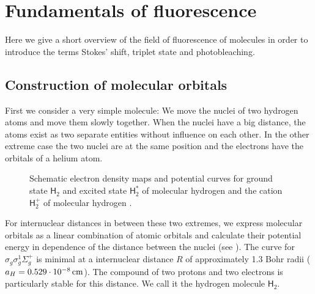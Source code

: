 \newenvironment{fenster}{%
  \begin{addmargin*}[
  5em]{5em}%
    \begin{minipage}{\linewidth}%
    \vspace{1em}
      \rule{\linewidth}{2pt}%
}{%
    \rule[
.25\baselineskip]{\linewidth}{2pt}%
\vspace{1em}
    \end{minipage}%
  \end{addmargin*}%
}
\renewcommand{\H}{\textsf{H}}
\renewcommand{\O}{\textsf{O}}
\section{Fundamentals of fluorescence}
\begin{summary}
  Here we give a short overview of the field of fluorescence of
  molecules in order to introduce the terms Stokes' shift, triplet
  state and photobleaching.
\end{summary}
\subsection{Construction of molecular orbitals}
First we consider a very simple molecule: We move the nuclei of two
hydrogen atoms and move them slowly together. When the nuclei have a
big distance, the atoms exist as two separate entities without
influence on each other. In the other extreme case the two nuclei are
at the same position and the electrons have the orbitals of a helium
atom.
\begin{figure}[!hbt]
  \centering
  
  \caption{Schematic electron density maps and potential curves for
    ground state $\H_2$ and excited state $\H_2^*$ of molecular
    hydrogen and the cation $\H_2^+$ of molecular hydrogen
    \citep[inspired from][p.~258]{Haken2006}.}
  \label{fig:flu-potential_my}
\end{figure}

For internuclear distances in between these two extremes, we express
molecular orbitals as a linear combination of atomic orbitals and
calculate their potential energy in dependence of the distance between
the nuclei (see ). The curve for
$\sigma_g\sigma_g^1\Sigma_g^+$ is minimal at a internuclear distance
$R$ of approximately 1.3 Bohr radii
($a_H=\unit[0.529\cdot10^{-8}]{cm}$). The compound of two protons and
two electrons is particularly stable for this distance. We call it the
hydrogen molecule $\H_2$.

